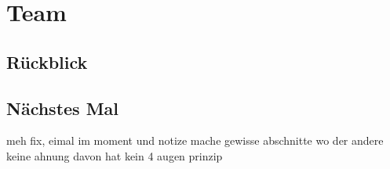 \chapter{Team}

\section{Rückblick}
\section{Nächstes Mal}



meh fix, eimal im moment
und notize mache
gewisse abschnitte wo der andere keine ahnung davon hat
kein 4 augen prinzip